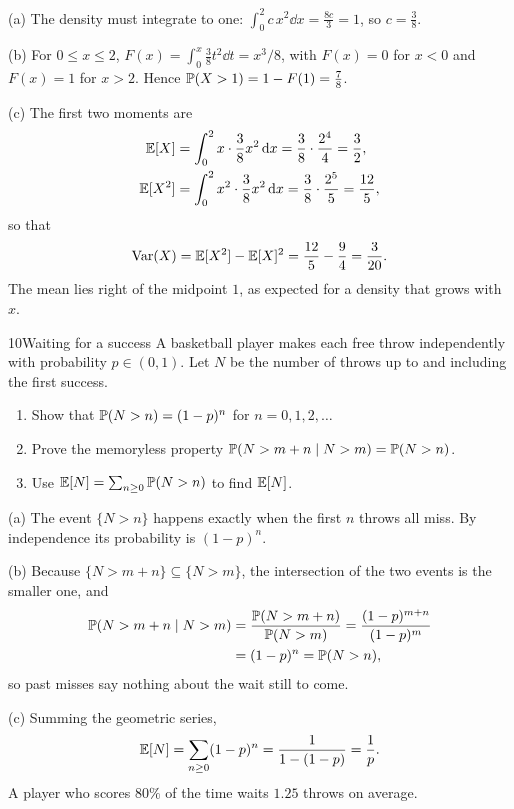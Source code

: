 \begin{solution}
(a) The density must integrate to one:
$\int_0^2 c\,x^2\dd x = \tfrac{8c}{3} = 1$, so $c = \tfrac38$.

(b) For $0\le x\le 2$, $F(x) = \int_0^x \tfrac38 t^2\dd t = x^3/8$, with
$F(x)=0$ for $x<0$ and $F(x)=1$ for $x>2$. Hence
$\mathbb{P}(X>1) = 1 - F(1) = \tfrac78$.

(c) The first two moments are
\begin{align*}
  \mathbb{E}[X]   &= \int_0^2 x\cdot\frac38 x^2\,\mathrm{d} x = \frac38\cdot\frac{2^4}{4} = \frac32, \\
  \mathbb{E}[X^2] &= \int_0^2 x^2\cdot\frac38 x^2\,\mathrm{d} x = \frac38\cdot\frac{2^5}{5} = \frac{12}{5},
\end{align*}
so that
\begin{equation*}
  \operatorname{Var}(X) = \mathbb{E}[X^2] - \mathbb{E}[X]^2 = \frac{12}{5} - \frac94 = \frac{3}{20}.
\end{equation*}
The mean lies right of the midpoint $1$, as expected for a density that
grows with $x$.
\end{solution}

\begin{problem}{10}{Waiting for a success}
A basketball player makes each free throw independently with probability
$p\in(0,1)$. Let $N$ be the number of throws up to and including the first
success.
\begin{enumerate}
  \item Show that $\mathbb{P}(N>n) = (1-p)^n$ for $n = 0,1,2,\dots$
  \item Prove the memoryless property
        $\mathbb{P}(N > m+n \mid N > m) = \mathbb{P}(N > n)$.
  \item Use $\mathbb{E}[N] = \sum_{n\ge0}\mathbb{P}(N>n)$ to find $\mathbb{E}[N]$.
\end{enumerate}
\end{problem}

\begin{solution}
(a) The event $\{N>n\}$ happens exactly when the first $n$ throws all miss.
By independence its probability is $(1-p)^n$.

(b) Because $\{N>m+n\}\subseteq\{N>m\}$, the intersection of the two events is
the smaller one, and
{\setlength{\belowdisplayskip}{8.6pt plus 3pt minus 6pt}%
\begin{align*}
  \mathbb{P}(N > m+n \mid N > m) &= \frac{\mathbb{P}(N>m+n)}{\mathbb{P}(N>m)}
     = \frac{(1-p)^{m+n}}{(1-p)^m} \\
  &= (1-p)^n = \mathbb{P}(N>n),
\end{align*}}%
so past misses say nothing about the wait still to come.

(c) Summing the geometric series,
\begin{equation*}
  \mathbb{E}[N] = \sum_{n\ge0}(1-p)^n = \frac{1}{1-(1-p)} = \frac1p .
\end{equation*}
A player who scores $80\%$ of the time waits $1.25$ throws on average.
\end{solution}

